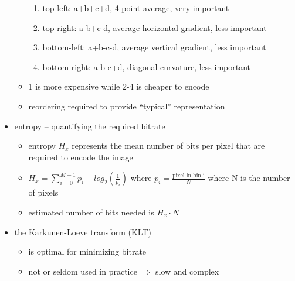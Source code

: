 \documentclass[a4paper,10pt]{scrreprt}
\begin{document}
\begin{itemize}
\begin{itemize}
 \begin{enumerate}
  \item top-left: a+b+c+d, 4 point average, very important
  \item top-right: a-b+c-d, average horizontal gradient, less important
  \item bottom-left: a+b-c-d, average vertical gradient, less important
  \item bottom-right: a-b-c+d, diagonal curvature, less important
 \end{enumerate}
 \item 1 is more expensive while 2-4 is cheaper to encode 
 \item reordering required to provide ``typical'' representation
\end{itemize}
 \item entropy -- quantifying the required bitrate
 \begin{itemize}
  \item entropy $H_x$ represents the mean number of bits per pixel that are required to encode the image 
  \item $H_x = \sum\limits_{i=0}^{M-1} p_i-log_2\left(\frac{1}{p_i}\right)$ where $p_i = \frac{\text{pixel in bin i}}{N}$ where N is the number of pixels
  \item estimated number of bits needed is $H_x\cdot N$
 \end{itemize}
 \item the Karkunen-Loeve transform (KLT)
 \begin{itemize}
  \item is optimal for minimizing bitrate
  \item not or seldom used in practice $\Rightarrow$ slow and complex
 \end{itemize}

\end{itemize}
\end{document}
